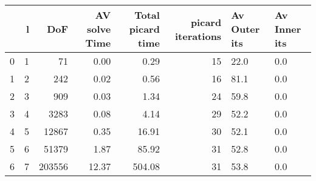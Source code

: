 \begin{tabular}{lrrrrrll}
\toprule
{} &  l &     DoF &  AV solve Time &  Total picard time &  picard iterations & Av Outer its & Av Inner its \\
\midrule
0 &  1 &      71 &           0.00 &               0.29 &                 15 &         22.0 &          0.0 \\
1 &  2 &     242 &           0.02 &               0.56 &                 16 &         81.1 &          0.0 \\
2 &  3 &     909 &           0.03 &               1.34 &                 24 &         59.8 &          0.0 \\
3 &  4 &    3283 &           0.08 &               4.14 &                 29 &         52.2 &          0.0 \\
4 &  5 &   12867 &           0.35 &              16.91 &                 30 &         52.1 &          0.0 \\
5 &  6 &   51379 &           1.87 &              85.92 &                 31 &         52.8 &          0.0 \\
6 &  7 &  203556 &          12.37 &             504.08 &                 31 &         53.8 &          0.0 \\
\bottomrule
\end{tabular}

